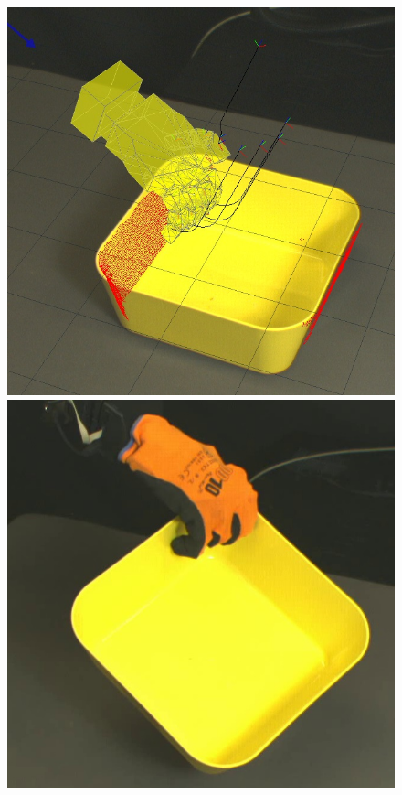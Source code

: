\begin{figure}
\begin{center}
  \includegraphics[width=\tw]{images/experiments/query/container1-1-s} \hspace{-6pt}
 \includegraphics[width=\tw]{images/experiments/exec/container1-s}

\end{center}
\end{figure}
